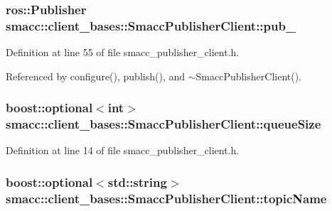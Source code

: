 \subsubsection[{\texorpdfstring{pub\+\_\+}{pub_}}]{\setlength{\rightskip}{0pt plus 5cm}ros\+::\+Publisher smacc\+::client\+\_\+bases\+::\+Smacc\+Publisher\+Client\+::pub\+\_\+\hspace{0.3cm}{\ttfamily [protected]}}\hypertarget{classsmacc_1_1client__bases_1_1SmaccPublisherClient_af39f498e73e8f956aae312065a4fd093}{}\label{classsmacc_1_1client__bases_1_1SmaccPublisherClient_af39f498e73e8f956aae312065a4fd093}


Definition at line 55 of file smacc\+\_\+publisher\+\_\+client.\+h.



Referenced by configure(), publish(), and $\sim$\+Smacc\+Publisher\+Client().

\subsubsection[{\texorpdfstring{queue\+Size}{queueSize}}]{\setlength{\rightskip}{0pt plus 5cm}boost\+::optional$<$int$>$ smacc\+::client\+\_\+bases\+::\+Smacc\+Publisher\+Client\+::queue\+Size}\hypertarget{classsmacc_1_1client__bases_1_1SmaccPublisherClient_a1a9b98681b01953f134191799a029fd3}{}\label{classsmacc_1_1client__bases_1_1SmaccPublisherClient_a1a9b98681b01953f134191799a029fd3}


Definition at line 14 of file smacc\+\_\+publisher\+\_\+client.\+h.

\subsubsection[{\texorpdfstring{topic\+Name}{topicName}}]{\setlength{\rightskip}{0pt plus 5cm}boost\+::optional$<$std\+::string$>$ smacc\+::client\+\_\+bases\+::\+Smacc\+Publisher\+Client\+::topic\+Name}\hypertarget{classsmacc_1_1client__bases_1_1SmaccPublisherClient_a8b8d98aef9b3b3a441005d2cb17b4fcc}{}\label{classsmacc_1_1client__bases_1_1SmaccPublisherClient_a8b8d98aef9b3b3a441005d2cb17b4fcc}


